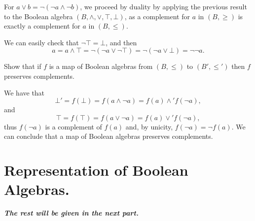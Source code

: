 \documentclass[fontsize=16pt,a4paper,DIV=17,parskip=half]{scrartcl}
\theoremstyle{definition}
\begin{document}
  For  $a \vee b = \lnot (\lnot a \land \lnot b)$, we proceed by duality by applying the previous result to the Boolean algebra $(B, \wedge, \vee, \top, \bot)$, as a complement for $a$ in $(B, \ge)$ is exactly a complement for $a$ in $(B, \le)$.

  We can easily check that $\lnot \top = \bot$, and then
  \[
  a = a \wedge \top = \lnot (\lnot a \vee \lnot \top) = \lnot (\lnot a \vee \bot) = \lnot \lnot a
  .\] 

  \begin{que}
    Show that if $f$ is a map of Boolean algebras from $(B, \le )$ to $(B', \le')$ then $f$ preserves complements.
  \end{que}

  We have that 
  \[
  \bot ' = f(\bot ) = f(a \wedge \lnot a) = f(a) \wedge' f(\lnot a)
  ,\] 
  and
  \[
  \top = f(\top) = f(a \vee \lnot a) = f(a) \vee' f(\lnot a)
  ,\]
  thus $f(\lnot a)$ is a complement of $f(a)$ and, by unicity, $f(\lnot a) = \lnot f(a)$.
  We can conclude that a map of Boolean algebras preserves complements.

  \section{Representation of Boolean Algebras.}

  \hfill

  \begin{center}
    \large\sffamily\itshape\bfseries
    The rest will be given in the next part.
  \end{center}
\end{document}
